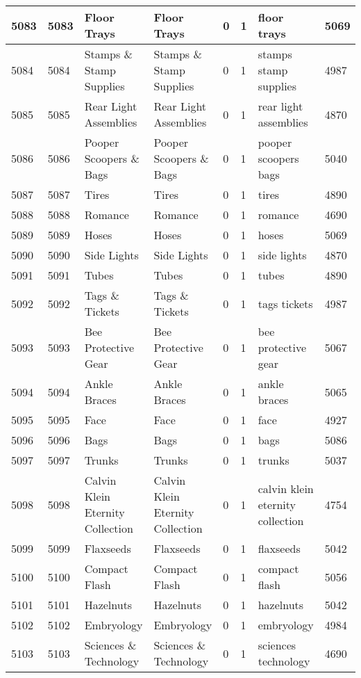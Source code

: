 \begin{longtable}{|l|l|l|l|l|l|l|l|}
5083 & 5083 & Floor Trays & Floor Trays & 0 & 1 & floor trays & 5069 \\ \hline 
5084 & 5084 & Stamps \& Stamp Supplies & Stamps \& Stamp Supplies & 0 & 1 & stamps stamp supplies & 4987 \\ \hline 
5085 & 5085 & Rear Light Assemblies & Rear Light Assemblies & 0 & 1 & rear light assemblies & 4870 \\ \hline 
5086 & 5086 & Pooper Scoopers \& Bags & Pooper Scoopers \& Bags & 0 & 1 & pooper scoopers bags & 5040 \\ \hline 
5087 & 5087 & Tires & Tires & 0 & 1 & tires & 4890 \\ \hline 
5088 & 5088 & Romance & Romance & 0 & 1 & romance & 4690 \\ \hline 
5089 & 5089 & Hoses & Hoses & 0 & 1 & hoses & 5069 \\ \hline 
5090 & 5090 & Side Lights & Side Lights & 0 & 1 & side lights & 4870 \\ \hline 
5091 & 5091 & Tubes & Tubes & 0 & 1 & tubes & 4890 \\ \hline 
5092 & 5092 & Tags \& Tickets & Tags \& Tickets & 0 & 1 & tags tickets & 4987 \\ \hline 
5093 & 5093 & Bee Protective Gear & Bee Protective Gear & 0 & 1 & bee protective gear & 5067 \\ \hline 
5094 & 5094 & Ankle Braces & Ankle Braces & 0 & 1 & ankle braces & 5065 \\ \hline 
5095 & 5095 & Face & Face & 0 & 1 & face & 4927 \\ \hline 
5096 & 5096 & Bags & Bags & 0 & 1 & bags & 5086 \\ \hline 
5097 & 5097 & Trunks & Trunks & 0 & 1 & trunks & 5037 \\ \hline 
5098 & 5098 & Calvin Klein Eternity Collection & Calvin Klein Eternity Collection & 0 & 1 & calvin klein eternity collection & 4754 \\ \hline 
5099 & 5099 & Flaxseeds & Flaxseeds & 0 & 1 & flaxseeds & 5042 \\ \hline 
5100 & 5100 & Compact Flash & Compact Flash & 0 & 1 & compact flash & 5056 \\ \hline 
5101 & 5101 & Hazelnuts & Hazelnuts & 0 & 1 & hazelnuts & 5042 \\ \hline 
5102 & 5102 & Embryology & Embryology & 0 & 1 & embryology & 4984 \\ \hline 
5103 & 5103 & Sciences \& Technology & Sciences \& Technology & 0 & 1 & sciences technology & 4690 \\ \hline 

\end{longtable}

